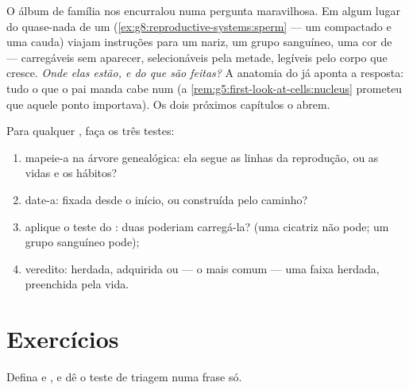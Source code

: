 \begin{remark}\label{rem:g9:heredity-and-traits:question}
O álbum de família nos encurralou numa pergunta maravilhosa.
Em algum lugar do quase-nada de um 
(\cref{ex:g8:reproductive-systems:sperm} --- um 
compactado e uma cauda) viajam instruções para um nariz, um
grupo sanguíneo, uma cor de  --- carregáveis sem
aparecer, selecionáveis pela metade, legíveis pelo corpo que
cresce. \emph{Onde elas estão, e do que são feitas?} A
anatomia do  já aponta a resposta: tudo o que
o pai manda cabe num  (a
\cref{rem:g5:first-look-at-cells:nucleus} prometeu que
aquele ponto importava). Os dois próximos capítulos o abrem.
\end{remark}

\begin{method}\label{met:g9:heredity-and-traits:audit}
Para qualquer , faça os três testes:
\begin{enumerate}
  \item mapeie-a na árvore genealógica: ela segue as linhas
        da reprodução, ou as vidas e os hábitos?
  \item date-a: fixada desde o início, ou construída pelo
        caminho?
  \item aplique o teste do : duas  poderiam
        carregá-la? (uma cicatriz não pode; um grupo
        sanguíneo pode);
  \item veredito: herdada, adquirida ou --- o mais comum ---
        uma faixa herdada, preenchida pela vida.
\end{enumerate}
\end{method}

\section{Exercícios}

\begin{exercise}[$\star$]\label{exo:g9:heredity-and-traits:1}
Defina  e , e dê o teste de
triagem numa frase só.
\end{exercise}

